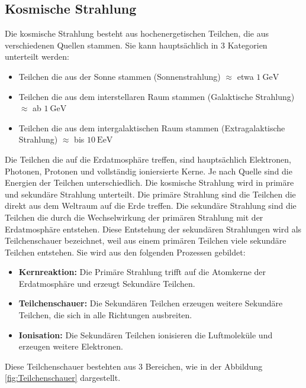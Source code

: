 \documentclass{article}
\begin{document}
\subsection{Kosmische Strahlung}
Die kosmische Strahlung besteht aus hochenergetischen Teilchen, die aus verschiedenen Quellen stammen.
Sie kann hauptsächlich in 3 Kategorien unterteilt werden:
\begin{itemize}
    \item Teilchen die aus der Sonne stammen (Sonnenstrahlung) $\approx$ etwa $\SI{1}{\giga\electronvolt}$
    \item Teilchen die aus dem interstellaren Raum stammen (Galaktische Strahlung) $\approx$ ab $\SI{1}{\giga\electronvolt}$ 
    \item Teilchen die aus dem intergalaktischen Raum stammen (Extragalaktische Strahlung)  $\approx$ bis $\SI{10}{\exa\electronvolt}$
\end{itemize}
Die Teilchen die auf die Erdatmosphäre treffen, sind hauptsächlich Elektronen, Photonen, Protonen und vollständig 
ioniersierte Kerne. Je nach Quelle sind die Energien der Teilchen unterschiedlich.
Die kosmische Strahlung wird in primäre und sekundäre Strahlung unterteilt.
Die primäre Strahlung sind die Teilchen die direkt aus dem Weltraum auf die Erde treffen.
Die sekundäre Strahlung sind die Teilchen die durch die Wechselwirkung der primären Strahlung mit der Erdatmosphäre entstehen.
Diese Entstehung der sekundären Strahlungen wird als Teilchenschauer bezeichnet, weil aus einem primären Teilchen viele sekundäre Teilchen entstehen. 
Sie wird aus den folgenden Prozessen gebildet:
\begin{itemize}
    \item \textbf{Kernreaktion:} Die Primäre Strahlung trifft auf die Atomkerne der Erdatmosphäre und erzeugt Sekundäre Teilchen.
    \item \textbf{Teilchenschauer:} Die Sekundären Teilchen erzeugen weitere Sekundäre Teilchen, die sich in alle Richtungen ausbreiten.
    \item \textbf{Ionisation:} Die Sekundären Teilchen ionisieren die Luftmoleküle und erzeugen weitere Elektronen.
\end{itemize}
Diese Teilchenschauer bestehten aus 3 Bereichen, wie in der Abbildung \ref{fig:Teilchenschauer} dargestellt.
\end{document}
